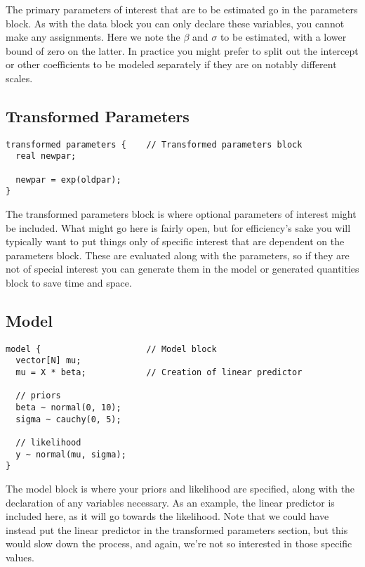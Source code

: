 \documentclass[]{book}
\begin{document}
The primary parameters of interest that are to be estimated go in the
{parameters } block. As with the data block you can only declare these
variables, you cannot make any assignments. Here we note the \(\beta\)
and \(\sigma\) to be estimated, with a lower bound of zero on the
latter. In practice you might prefer to split out the intercept or other
coefficients to be modeled separately if they are on notably different
scales.

\subsection{Transformed Parameters}\label{transformed-parameters}

\begin{verbatim}
transformed parameters {    // Transformed parameters block
  real newpar;
  
  newpar = exp(oldpar);
} 
\end{verbatim}

The {transformed parameters} block is where optional parameters of
interest might be included. What might go here is fairly open, but for
efficiency's sake you will typically want to put things only of specific
interest that are dependent on the parameters block. These are evaluated
along with the parameters, so if they are not of special interest you
can generate them in the model or generated quantities block to save
time and space.

\subsection{Model}\label{model}

\begin{verbatim}
model {                     // Model block
  vector[N] mu;
  mu = X * beta;            // Creation of linear predictor
  
  // priors
  beta ~ normal(0, 10);
  sigma ~ cauchy(0, 5);     
  
  // likelihood
  y ~ normal(mu, sigma);
}
\end{verbatim}

The {model} block is where your priors and likelihood are specified,
along with the declaration of any variables necessary. As an example,
the linear predictor is included here, as it will go towards the
likelihood.
Note that we could have instead put the linear predictor in the
transformed parameters section, but this would slow down the process,
and again, we're not so interested in those specific values.
\end{document}

